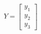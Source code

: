 \documentclass[preview]{standalone}
\begin{document}
\begin{align*}
Y = \begin{bmatrix} y_1 \\ y_2 \\ y_3 \end{bmatrix}
\end{align*}
\end{document}
